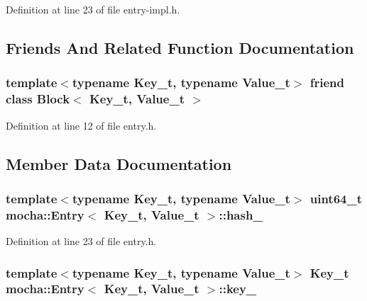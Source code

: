 Definition at line 23 of file entry-\/impl.h.



\subsection{Friends And Related Function Documentation}
\hypertarget{classmocha_1_1_entry_a18e2777bf26866165b51548794451c8a}{
\subsubsection[{Block$<$ Key\_\-t, Value\_\-t $>$}]{\setlength{\rightskip}{0pt plus 5cm}template$<$typename Key\_\-t, typename Value\_\-t$>$ friend class {\bf Block}$<$ Key\_\-t, Value\_\-t $>$}}
\label{classmocha_1_1_entry_a18e2777bf26866165b51548794451c8a}


Definition at line 12 of file entry.h.



\subsection{Member Data Documentation}
\hypertarget{classmocha_1_1_entry_a5bb6e09fcbb7d2a02ed2a3ab99a9e47b}{
\subsubsection[{hash\_\-}]{\setlength{\rightskip}{0pt plus 5cm}template$<$typename Key\_\-t, typename Value\_\-t$>$ uint64\_\-t {\bf mocha::Entry}$<$ Key\_\-t, Value\_\-t $>$::{\bf hash\_\-}}}
\label{classmocha_1_1_entry_a5bb6e09fcbb7d2a02ed2a3ab99a9e47b}


Definition at line 23 of file entry.h.

\hypertarget{classmocha_1_1_entry_aa9631dc6ed634001c81ed4a115d997d4}{
\subsubsection[{key\_\-}]{\setlength{\rightskip}{0pt plus 5cm}template$<$typename Key\_\-t, typename Value\_\-t$>$ Key\_\-t {\bf mocha::Entry}$<$ Key\_\-t, Value\_\-t $>$::{\bf key\_\-}}}
\label{classmocha_1_1_entry_aa9631dc6ed634001c81ed4a115d997d4}


